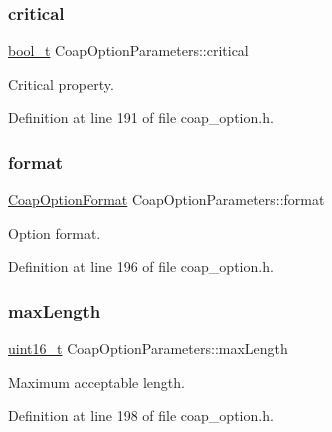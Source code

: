\subsubsection{\texorpdfstring{critical}{critical}}
{\footnotesize\ttfamily \hyperlink{compiler__port_8h_a812d16e5494522586b3784e55d479912}{bool\+\_\+t} Coap\+Option\+Parameters\+::critical}



Critical property. 



Definition at line 191 of file coap\+\_\+option.\+h.

\mbox{\label{structCoapOptionParameters_affe8a594bbb492d66201b65b65106949}} 
\subsubsection{\texorpdfstring{format}{format}}
{\footnotesize\ttfamily \hyperlink{coap__option_8h_a0dafb13dafce37cff605bb260a1ed02e}{Coap\+Option\+Format} Coap\+Option\+Parameters\+::format}



Option format. 



Definition at line 196 of file coap\+\_\+option.\+h.

\mbox{\label{structCoapOptionParameters_a8fd3fc81d691b88be52674fb5e585ed0}} 
\subsubsection{\texorpdfstring{max\+Length}{maxLength}}
{\footnotesize\ttfamily \hyperlink{stdint_8h_a273cf69d639a59973b6019625df33e30}{uint16\+\_\+t} Coap\+Option\+Parameters\+::max\+Length}



Maximum acceptable length. 



Definition at line 198 of file coap\+\_\+option.\+h.

\mbox{\label{structCoapOptionParameters_a76c1e1cedbc6c598a519a8dff5eaa2c2}} 
